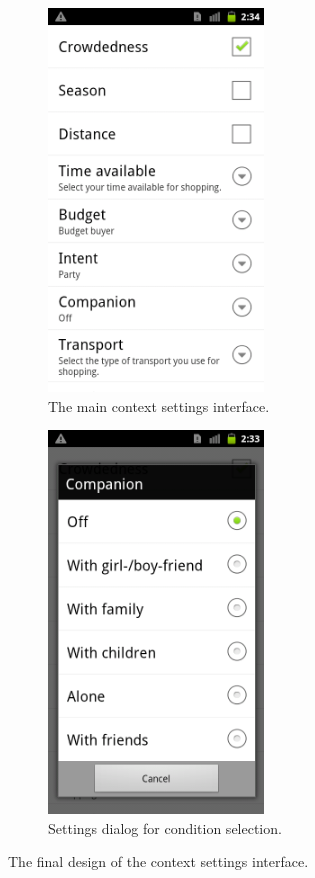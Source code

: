 \begin{figure}[H]
\centering
\begin{subfigure}{.5\textwidth}
  \centering
  \includegraphics[height=4in]{figures/setting1.png}
  \caption{The main context settings interface.}
  \label{fig:contextSettings1}
\end{subfigure}%
\begin{subfigure}{.5\textwidth}
  \centering
  \includegraphics[height=4in]{figures/setting2.png}
  \caption{Settings dialog for condition selection.}
  \label{fig:contextSettings2}
\end{subfigure}
\caption{The final design of the context settings interface.}
\label{fig:contextSettings}
\end{figure}


